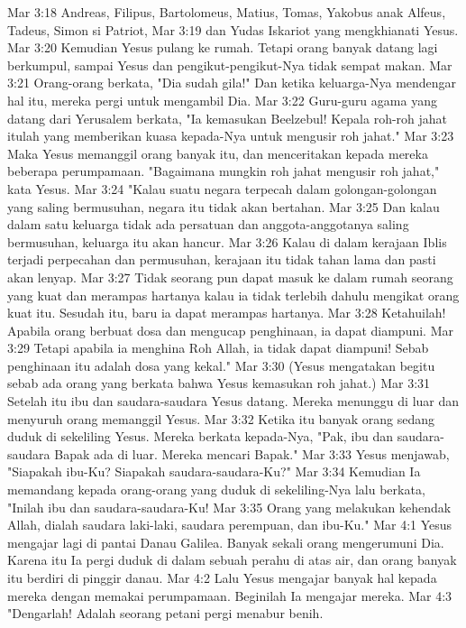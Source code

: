 Mar 3:18  Andreas, Filipus, Bartolomeus, Matius, Tomas, Yakobus anak Alfeus, Tadeus, Simon si Patriot,
Mar 3:19  dan Yudas Iskariot yang mengkhianati Yesus.
Mar 3:20  Kemudian Yesus pulang ke rumah. Tetapi orang banyak datang lagi berkumpul, sampai Yesus dan pengikut-pengikut-Nya tidak sempat makan.
Mar 3:21  Orang-orang berkata, "Dia sudah gila!" Dan ketika keluarga-Nya mendengar hal itu, mereka pergi untuk mengambil Dia.
Mar 3:22  Guru-guru agama yang datang dari Yerusalem berkata, "Ia kemasukan Beelzebul! Kepala roh-roh jahat itulah yang memberikan kuasa kepada-Nya untuk mengusir roh jahat."
Mar 3:23  Maka Yesus memanggil orang banyak itu, dan menceritakan kepada mereka beberapa perumpamaan. "Bagaimana mungkin roh jahat mengusir roh jahat," kata Yesus.
Mar 3:24  "Kalau suatu negara terpecah dalam golongan-golongan yang saling bermusuhan, negara itu tidak akan bertahan.
Mar 3:25  Dan kalau dalam satu keluarga tidak ada persatuan dan anggota-anggotanya saling bermusuhan, keluarga itu akan hancur.
Mar 3:26  Kalau di dalam kerajaan Iblis terjadi perpecahan dan permusuhan, kerajaan itu tidak tahan lama dan pasti akan lenyap.
Mar 3:27  Tidak seorang pun dapat masuk ke dalam rumah seorang yang kuat dan merampas hartanya kalau ia tidak terlebih dahulu mengikat orang kuat itu. Sesudah itu, baru ia dapat merampas hartanya.
Mar 3:28  Ketahuilah! Apabila orang berbuat dosa dan mengucap penghinaan, ia dapat diampuni.
Mar 3:29  Tetapi apabila ia menghina Roh Allah, ia tidak dapat diampuni! Sebab penghinaan itu adalah dosa yang kekal."
Mar 3:30  (Yesus mengatakan begitu sebab ada orang yang berkata bahwa Yesus kemasukan roh jahat.)
Mar 3:31  Setelah itu ibu dan saudara-saudara Yesus datang. Mereka menunggu di luar dan menyuruh orang memanggil Yesus.
Mar 3:32  Ketika itu banyak orang sedang duduk di sekeliling Yesus. Mereka berkata kepada-Nya, "Pak, ibu dan saudara-saudara Bapak ada di luar. Mereka mencari Bapak."
Mar 3:33  Yesus menjawab, "Siapakah ibu-Ku? Siapakah saudara-saudara-Ku?"
Mar 3:34  Kemudian Ia memandang kepada orang-orang yang duduk di sekeliling-Nya lalu berkata, "Inilah ibu dan saudara-saudara-Ku!
Mar 3:35  Orang yang melakukan kehendak Allah, dialah saudara laki-laki, saudara perempuan, dan ibu-Ku."
Mar 4:1  Yesus mengajar lagi di pantai Danau Galilea. Banyak sekali orang mengerumuni Dia. Karena itu Ia pergi duduk di dalam sebuah perahu di atas air, dan orang banyak itu berdiri di pinggir danau.
Mar 4:2  Lalu Yesus mengajar banyak hal kepada mereka dengan memakai perumpamaan. Beginilah Ia mengajar mereka.
Mar 4:3  "Dengarlah! Adalah seorang petani pergi menabur benih.
